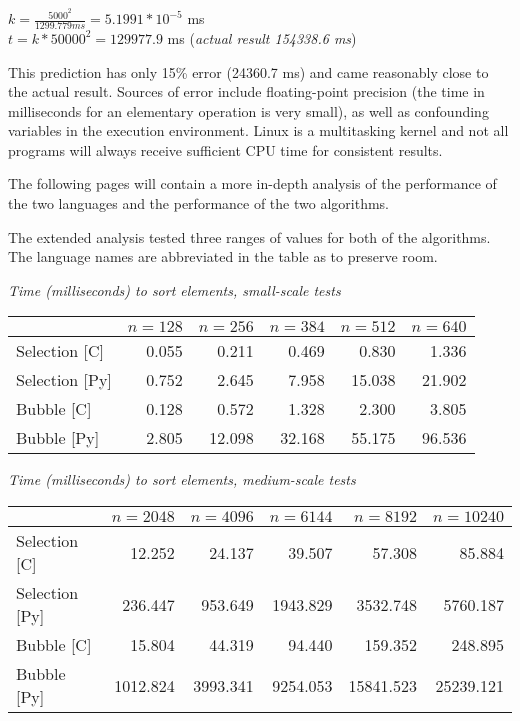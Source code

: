 \documentclass{article}
\begin{document}
\begin{center}
	$k = \frac{5000^2}{1299.779 ms} = 5.1991 * 10^{- 5}$ ms \\
	$t = k*50000^2 = 129977.9$ ms (\textit{actual result 154338.6 ms})
\end{center}

This prediction has only 15\% error (24360.7 ms) and came reasonably close to the actual result. Sources of error include floating-point precision (the time in milliseconds for an elementary operation is very small), as well as confounding variables in the execution environment. Linux is a multitasking kernel and not all programs will always receive sufficient CPU time for consistent results.

The following pages will contain a more in-depth analysis of the performance of the two languages and the performance of the two algorithms.

\newpage

The extended analysis tested three ranges of values for both of the algorithms. The language names are abbreviated in the table as to preserve room.

\begin{center}
	\textit{Time (milliseconds) to sort elements, small-scale tests}
	\begin{tabular}{l | r | r | r | r | r}
		& $n=128$ & $n=256$ & $n=384$ & $n=512$ & $n=640$ \\ \hline
		Selection [C] & 0.055 & 0.211 & 0.469 & 0.830 & 1.336 \\ \hline
		Selection [Py] & 0.752 & 2.645 & 7.958 & 15.038 & 21.902 \\ \hline
		Bubble [C] & 0.128 & 0.572 & 1.328 & 2.300 & 3.805 \\ \hline
		Bubble [Py] & 2.805 & 12.098 & 32.168 & 55.175 & 96.536 \\
	\end{tabular}
\end{center}

\begin{center}
	\textit{Time (milliseconds) to sort elements, medium-scale tests}
	\begin{tabular}{l | r | r | r | r | r}
		& $n=2048$ & $n=4096$ & $n=6144$ & $n=8192$ & $n=10240$ \\ \hline
		Selection [C] & 12.252 & 24.137 & 39.507 & 57.308 & 85.884 \\ \hline
		Selection [Py] & 236.447 & 953.649 & 1943.829 & 3532.748 & 5760.187 \\ \hline
		Bubble [C] & 15.804 & 44.319 & 94.440 & 159.352 & 248.895 \\ \hline
		Bubble [Py] & 1012.824 & 3993.341 & 9254.053 & 15841.523 & 25239.121 \\
	\end{tabular}
\end{center}
\end{document}
